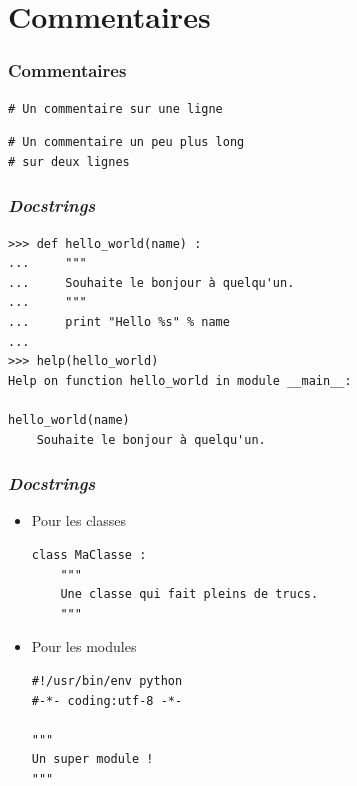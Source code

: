 \documentclass[xcolor=pdftex,dvipsnames,table,handout]{beamer}
\begin{document}
\section{Commentaires}

\begin{frame}[fragile]
\frametitle{Commentaires}
\begin{lstlisting}
# Un commentaire sur une ligne
\end{lstlisting}
\begin{lstlisting}
# Un commentaire un peu plus long
# sur deux lignes
\end{lstlisting}
\end{frame}

\begin{frame}[fragile]
\frametitle{\textit{Docstrings}}
\begin{lstlisting}
>>> def hello_world(name) :
...     """
...     Souhaite le bonjour à quelqu'un.
...     """
...     print "Hello %s" % name
... 
>>> help(hello_world)
Help on function hello_world in module __main__:

hello_world(name)
    Souhaite le bonjour à quelqu'un.
\end{lstlisting}
\end{frame}

%
%
%
%

\begin{frame}[fragile]
\frametitle{\textit{Docstrings}}
\begin{itemize}
\item Pour les classes%
\begin{lstlisting}
class MaClasse :
    """
    Une classe qui fait pleins de trucs.
    """
\end{lstlisting}
\item Pour les modules%
\begin{lstlisting}
#!/usr/bin/env python
#-*- coding:utf-8 -*-

"""
Un super module !
"""
\end{lstlisting}
\end{itemize}
\end{frame}
\end{document}
